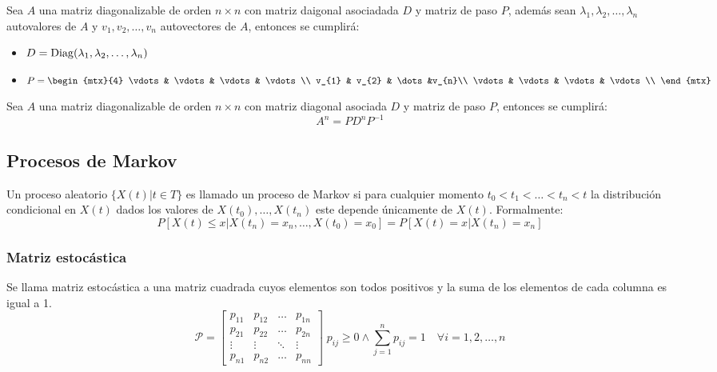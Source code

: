 \begin{prop}
  Sea $A$ una matriz diagonalizable de orden $n \times n$ con matriz daigonal asociadada $D$ y matriz de paso $P$, además sean $\lambda_{1},\lambda_{2},\dots,\lambda_{n}$ autovalores de $A$ y $v_{1},v_{2},\dots,v_{n}$ autovectores de $A$, entonces se cumplirá:
	\begin{itemize}
		\item $D = \operatorname{Diag}(\lambda_{1},\lambda_{2},\dots,\lambda_{n})$
		\item $P = \begin{mtx}{4}
				\vdots & \vdots & \vdots & \vdots\\
				v_{1} & v_{2} & \dots &v_{n}\\
				\vdots & \vdots & \vdots & \vdots\\
		\end{mtx}$
	\end{itemize}
\end{prop}

\begin{prop}\label{diagpot}
	Sea $A$ una matriz diagonalizable de orden $n \times n$ con matriz diagonal asociada $D$ y matriz de paso $P$, entonces se cumplirá:
	\[
	  A^{n} = PD^{n}P^{-1}
	\]
\end{prop}


\subsection{Procesos de Markov}

\begin{definition}
    Un proceso aleatorio $\{X(t)|t\in T\}$ es llamado un proceso de Markov si para cualquier momento $t_0<t_1<\dots<t_n<t$ la distribución condicional en $X(t)$ dados los valores de $X(t_0),\dots,X(t_n)$ este depende únicamente de $X(t)$. Formalmente:
    \[
        P[X(t)\leq x| X(t_n) = x_n,\dots,X(t_0) = x_0] = P[X(t)=x| X(t_n) = x_n]
    \]
\end{definition}

\subsubsection{Matriz estocástica}

\begin{definition}
    Se llama matriz estocástica a una matriz cuadrada cuyos elementos son todos positivos y la suma de los elementos de cada columna es igual a 1.
    \[
        \mathcal{P} = \left[
        \begin{array}{cccc}
            p_{11} & p_{12} & \dots & p_{1n}\\
            p_{21} & p_{22} & \dots & p_{2n}\\
            \vdots & \vdots & \ddots & \vdots\\
            p_{n1} & p_{n2} & \dots & p_{nn}
        \end{array}
        \right] \; p_{ij} \geq 0 \land \sum_{j=1}^{n}p_{ij} = 1 \quad \forall i = 1,2,\dots,n
    \] 
\end{definition}

